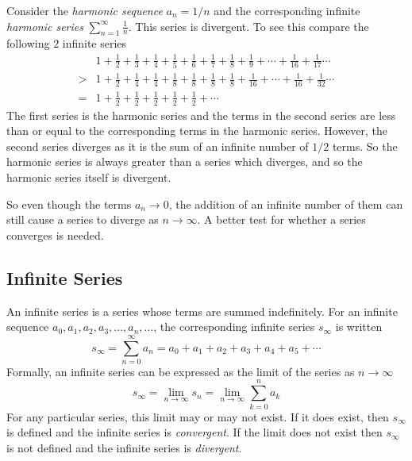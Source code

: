 Consider the \emph{harmonic sequence} $a_n=1/n$ and the corresponding infinite \emph{harmonic series} $\displaystyle \sum_{n=1}^{\infty} \frac{1}{n}$. This series is divergent. To see this compare the following $2$ infinite series
\begin{align*}
  &1+\frac{1}{2}+\frac{1}{3}+\frac{1}{4}+\frac{1}{5}+\frac{1}{6}+\frac{1}{7}+\frac{1}{8}+\frac{1}{9}+\cdots+\frac{1}{16}+\frac{1}{17}\cdots\\
  >&1+\frac{1}{2}+\frac{1}{4}+\frac{1}{4}+\frac{1}{8}+\frac{1}{8}+\frac{1}{8}+\frac{1}{8}+\frac{1}{16}+\cdots+\frac{1}{16}+\frac{1}{32}\cdots\\
  = & 1+\frac{1}{2}+\frac{1}{2}+\frac{1}{2}+\frac{1}{2}+\frac{1}{2}+\cdots
\end{align*}
The first series is the harmonic series and the terms in the second series are less than or equal to the corresponding terms in the harmonic series. However, the second series diverges as it is the sum of an infinite number of $1/2$ terms. So the harmonic series is always greater than a series which diverges, and so the harmonic series itself is divergent.

So even though the terms $a_n \to 0$, the addition of an infinite number of them can still cause a series to diverge as $n \to \infty $. A better test for whether a series converges is needed.

\newpage


\pagebreak
\subsection*{Infinite Series}
An infinite series is a series whose terms are summed indefinitely. For an infinite sequence $a_0,a_1,a_2,a_3,\ldots,a_n,\ldots$, the corresponding infinite series $s_\infty$ is written
\begin{equation*}
  s_\infty=\sum_{n=0}^{\infty}a_n=a_0+a_1+a_2+a_3+a_4+a_5+\cdots
\end{equation*}
Formally, an infinite series can be expressed as the limit of the series as $n\to \infty$
\begin{equation*}
  s_\infty = \lim_{n \to \infty} s_n = \lim_{n \to \infty} \sum_{k=0}^n a_k 
\end{equation*}
For any particular series, this limit may or may not exist. If it does exist, then $s_\infty$ is defined and the infinite series is \emph{convergent}. If the limit does not exist then $s_\infty$ is not defined and the infinite series is \emph{divergent}.

